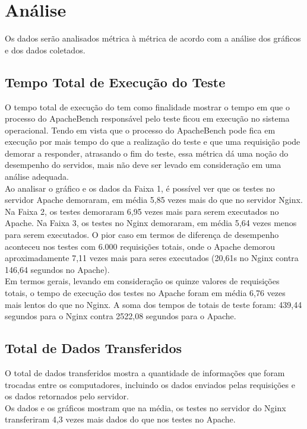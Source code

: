 \section{Análise}\label{sec:analise-dos-dados}
Os dados serão analisados métrica à métrica de acordo com a análise dos 
gráficos e dos dados coletados.
\subsection{Tempo Total de Execução do Teste}
O tempo total de execução do tem como finalidade mostrar o tempo em que o 
processo do ApacheBench responsável pelo teste ficou em execução no sistema 
operacional. Tendo em vista que o processo do ApacheBench pode fica em execução 
por mais tempo do que a realização do teste e que uma requisição pode demorar a 
responder, atrasando o fim do teste, essa métrica dá uma noção do desempenho do 
servidos, mais não deve ser levado em consideração em uma análise adequada.\\
Ao analisar o gráfico e os dados da Faixa 1, é possível ver que os testes no 
servidor Apache demoraram, em média 5,85 vezes mais do que no servidor Nginx. 
Na Faixa 2, os testes demoraram 6,95 vezes mais para serem executados no 
Apache. Na Faixa 3, os testes no Nginx demoraram, em média 5,64 vezes menos 
para serem executados. O pior caso em termos de diferença de desempenho 
aconteceu nos testes com 6.000 requisições totais, onde o Apache demorou 
aproximadamente 7,11 vezes mais para seres executados (20,61s no Nginx contra 
146,64 segundos no Apache).\\
Em termos gerais, levando em consideração os quinze valores de requisições 
totais, o tempo de execução dos testes no Apache foram em média 6,76 vezes mais 
lentos do que no Nginx. A soma dos tempos de totais de teste foram: 439,44 
segundos para o Nginx contra 2522,08 segundos para o Apache.
\subsection{Total de Dados Transferidos}
O total de dados transferidos mostra a quantidade de informações que foram 
trocadas entre os computadores, incluindo os dados enviados pelas requisições e 
os dados retornados pelo servidor.\\
Os dados e os gráficos mostram que na média, os testes no servidor do Nginx 
transferiram 4,3 vezes mais dados do que nos testes no Apache. 

